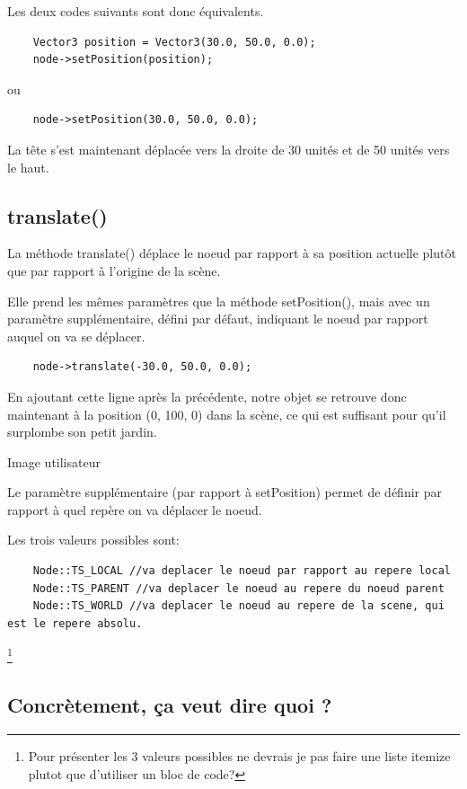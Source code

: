 \documentclass[10pt,a4paper]{report}
\begin{document}
Les deux codes suivants sont donc \'equivalents.
\begin{lstlisting}
	Vector3 position = Vector3(30.0, 50.0, 0.0);
	node->setPosition(position);
\end{lstlisting}

ou
\begin{lstlisting}
	node->setPosition(30.0, 50.0, 0.0);
\end{lstlisting}

La t\^ete s'est maintenant d\'eplac\'ee vers la droite de 30 unit\'es et de 50 unit\'es vers le haut.




\subsection{translate()}

La m\'ethode translate() d\'eplace le noeud par rapport \`{a} sa position actuelle plut\^ot que par rapport \`{a} l'origine de la sc\`ene.

Elle prend les m\^emes param\`etres que la m\'ethode setPosition(), mais avec un param\`etre suppl\'ementaire, d\'efini par d\'efaut, indiquant le noeud par rapport auquel on va se d\'eplacer.
\begin{lstlisting}
	node->translate(-30.0, 50.0, 0.0);
\end{lstlisting}

En ajoutant cette ligne apr\`es la pr\'ec\'edente, notre objet se retrouve donc maintenant \`{a} la position (0, 100, 0) dans la sc\`ene, ce qui est suffisant pour qu'il surplombe son petit jardin.

Image utilisateur

Le param\`etre suppl\'ementaire (par rapport \`{a} setPosition) permet de d\'efinir par rapport \`{a} quel rep\`ere on va d\'eplacer le noeud.

Les trois valeurs possibles sont:
\begin{lstlisting}
    Node::TS_LOCAL //va deplacer le noeud par rapport au repere local
    Node::TS_PARENT //va deplacer le noeud au repere du noeud parent
    Node::TS_WORLD //va deplacer le noeud au repere de la scene, qui est le repere absolu.
\end{lstlisting}\footnote{Pour présenter les 3 valeurs possibles ne devrais je pas faire une liste itemize plutot que d'utiliser un bloc de code?}



\subsection{Concr\`etement, \c{c}a veut dire quoi ?}
\end{document}
